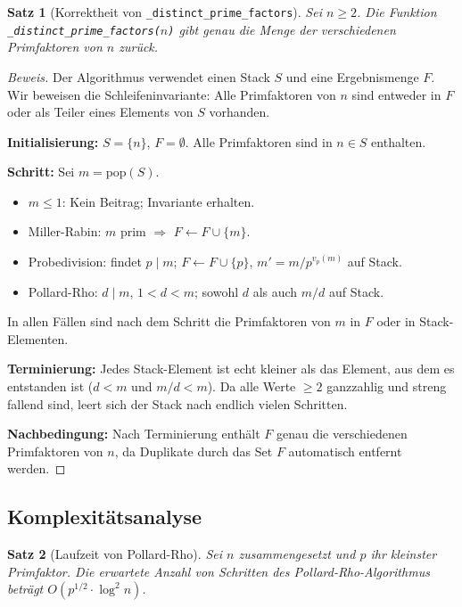 ﻿\documentclass[12pt, a4paper]{article}
\theoremstyle{plain}
\newtheorem{theorem}{Satz}[section]
\theoremstyle{definition}
\theoremstyle{remark}
\newenvironment{myproof}[1][Beweis]{%
  \begin{proof}[#1]
}{%
  \end{proof}
}
\begin{document}
\begin{theorem}[Korrektheit von \texttt{\_distinct\_prime\_factors}]
\label{thm:dpf_korrekt}
  Sei $n \ge 2$. Die Funktion \texttt{\_distinct\_prime\_factors($n$)}
  gibt genau die Menge der verschiedenen Primfaktoren von $n$ zur\"uck.
\end{theorem}

\begin{myproof}
  Der Algorithmus verwendet einen Stack $S$ und eine Ergebnismenge $F$.
  Wir beweisen die Schleifeninvariante: Alle Primfaktoren von $n$ sind entweder in $F$
  oder als Teiler eines Elements von $S$ vorhanden.

  \textbf{Initialisierung:} $S = \{n\}$, $F = \emptyset$. Alle
  Primfaktoren sind in $n \in S$ enthalten.

  \textbf{Schritt:} Sei $m = \mathrm{pop}(S)$.
  \begin{itemize}
    \item $m \le 1$: Kein Beitrag; Invariante erhalten.
    \item Miller-Rabin: $m$ prim $\Rightarrow$ $F \leftarrow F \cup \{m\}$.
    \item Probedivision: findet $p \mid m$;
      $F \leftarrow F \cup \{p\}$, $m' = m/p^{v_p(m)}$ auf Stack.
    \item Pollard-Rho: $d \mid m$, $1 < d < m$;
      sowohl $d$ als auch $m/d$ auf Stack.
  \end{itemize}
  In allen F\"allen sind nach dem Schritt die Primfaktoren von $m$
  in $F$ oder in Stack-Elementen.

  \textbf{Terminierung:} Jedes Stack-Element ist echt kleiner als das
  Element, aus dem es entstanden ist ($d < m$ und $m/d < m$).
  Da alle Werte $\ge 2$ ganzzahlig und streng fallend sind, leert
  sich der Stack nach endlich vielen Schritten.

  \textbf{Nachbedingung:} Nach Terminierung enth\"alt $F$ genau die
  verschiedenen Primfaktoren von $n$, da Duplikate durch das Set $F$
  automatisch entfernt werden. 
\end{myproof}

\subsection{Komplexit\"atsanalyse}
\label{subsec:phi_komplexitaet}

\begin{theorem}[Laufzeit von Pollard-Rho]\label{thm:pollard_laufzeit}
  Sei $n$ zusammengesetzt und $p$ ihr kleinster Primfaktor.
  Die erwartete Anzahl von Schritten des Pollard-Rho-Algorithmus
  betr\"agt $O(p^{1/2} \cdot \log^2 n)$.
\end{theorem}
\end{document}
